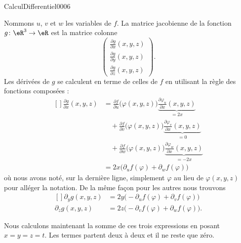 \begin{corrige}{CalculDifferentiel0006}

	Nommons $u$, $v$ et $w$ les variables de $f$. La matrice jacobienne de la fonction $g\colon \eR^3\to \eR$ est la matrice colonne
	\begin{equation}
		\begin{pmatrix}
			\displaystyle\frac{ \partial g }{ \partial x }(x,y,z)	\\ 
			\displaystyle\frac{ \partial g }{ \partial y }(x,y,z)	\\ 
			\displaystyle\frac{ \partial g }{ \partial z }(x,y,z)	
		\end{pmatrix}.
	\end{equation}
	Les dérivées de $g$ se calculent en terme de celles de $f$ en utilisant la règle des fonctions composées :
	\begin{equation}
		\begin{aligned}[]
			\frac{ \partial g }{ \partial x }(x,y,z)&=\frac{ \partial f }{ \partial u }\big( \varphi(x,y,z) \big)\underbrace{\frac{ \partial \varphi_u }{ \partial x }(x,y,z)}_{=2x}\\
			&\quad+\frac{ \partial f }{ \partial v }\big( \varphi(x,y,z) \big)\underbrace{\frac{ \partial \varphi_v }{ \partial x }(x,y,z)}_{=0}\\
			&\quad+\frac{ \partial f }{ \partial w }\big( \varphi(x,y,z) \big)\underbrace{\frac{ \partial \varphi_w }{ \partial x }(x,y,z)}_{=-2x}\\
			&=2x\big( \partial_uf(\varphi)+\partial_wf(\varphi) \big)
		\end{aligned}
	\end{equation}
	où nous avons noté, sur la dernière ligne, simplement $\varphi$ au lieu de $\varphi(x,y,z)$ pour alléger la notation. De la même façon pour les autres nous trouvons
	\begin{equation}
		\begin{aligned}[]
			\partial_yg(x,y,z)&=2y\big( -\partial_uf(\varphi)+\partial_vf(\varphi) \big)\\
			\partial_zg(x,y,z)&=2z\big( -\partial_vf(\varphi)+\partial_wf(\varphi) \big).
		\end{aligned}
	\end{equation}
	
	Nous calculons maintenant la somme de ces trois expressions en posant $x=y=z=t$. Les termes partent deux à deux et il ne reste que zéro.
\end{corrige}
